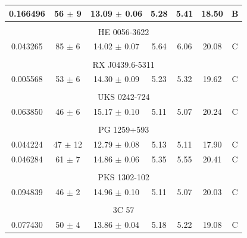 \begin{longtable}{ccccccc}
            0.166496  &  56 $\pm$ 9  &  13.09 $\pm$ 0.06  &  5.28  &  5.41  &  18.50  &  B \\

            \hline \tabularnewline

            \multicolumn{7}{c}{HE 0056-3622} \\ \hline 

            0.043265  &  85 $\pm$ 6  &  14.02 $\pm$ 0.07  &  5.64  &  6.06  &  20.08  &  C \\

            \hline \tabularnewline

            \multicolumn{7}{c}{RX J0439.6-5311} \\ \hline 

            0.005568  &  53 $\pm$ 6  &  14.30 $\pm$ 0.09  &  5.23  &  5.32  &  19.62  &  C \\

            \hline \tabularnewline

            \multicolumn{7}{c}{UKS 0242-724} \\ \hline 

            0.063850  &  46 $\pm$ 6  &  15.17 $\pm$ 0.10  &  5.11  &  5.07  &  20.24  &  C \\

            \hline \tabularnewline

            \multicolumn{7}{c}{PG 1259+593} \\ \hline 

            0.044224  &  47 $\pm$ 12  &  12.79 $\pm$ 0.08  &  5.13  &  5.11  &  17.90  &  C \\
            0.046284  &  61 $\pm$ 7  &  14.86 $\pm$ 0.06  &  5.35  &  5.55  &  20.41  &  C \\

            \hline \tabularnewline

            \multicolumn{7}{c}{PKS 1302-102} \\ \hline 

            0.094839  &  46 $\pm$ 2  &  14.96 $\pm$ 0.10  &  5.11  &  5.07  &  20.03  &  C \\

            \hline \tabularnewline

            \multicolumn{7}{c}{3C 57} \\ \hline 

            0.077430  &  50 $\pm$ 4  &  13.86 $\pm$ 0.04  &  5.18  &  5.22  &  19.08  &  C \\


\end{longtable}
